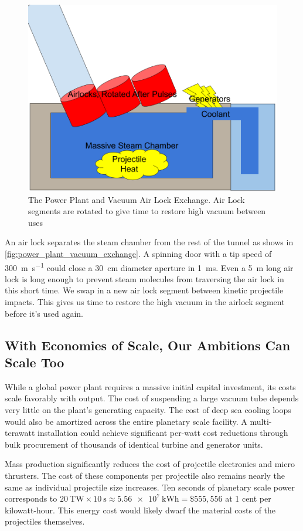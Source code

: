 \documentclass{article}
\begin{document}
\begin{figure}[htpb]
    \centering
    \includegraphics[width=0.5\linewidth]{images/Power Plant Cooling and Generators.png}
    \caption{The Power Plant and Vacuum Air Lock Exchange.  Air Lock segments are rotated to give time to restore high vacuum between uses}
    \label{fig:power_plant_vacuum_exchange}
\end{figure}

An air lock separates the steam chamber from the rest of the tunnel as shows in \autoref{fig:power_plant_vacuum_exchange}.   A spinning door with a tip speed of \SI{300}{\meter\per\second} could close a \SI{30}{\centi\meter} diameter aperture in \SI{1}{\milli\second}.  Even a \SI{5}{\meter} long air lock is long enough to prevent steam molecules from traversing the air lock in this short time.   We swap in a new air lock segment between kinetic projectile impacts.  This gives us time to restore the high vacuum in the airlock segment before it's used again.   


\subsection{With Economies of Scale, Our Ambitions Can Scale Too}\label{sec:strawway_economics}

While a global power plant requires a massive initial capital investment, its costs scale favorably with output. The cost of suspending a large vacuum tube depends very little on the plant's generating capacity. The cost of deep sea cooling loops would also be amortized across the entire planetary scale facility.  A multi-terawatt installation could achieve significant per-watt cost reductions through bulk procurement of thousands of identical turbine and generator units. 

Mass production significantly reduces the cost of projectile electronics and micro thrusters. The cost of these components per projectile also remains nearly the same as individual projectile size increases.  Ten seconds of planetary scale power corresponds to $\SI{20}{\tera\watt} \times \SI{10}{\second} \approx \SI{5.56e7}{\kilo\watt\hour} = \$555,556$ at 1 cent per kilowatt-hour.  This energy cost would likely dwarf the material costs of the projectiles themselves.      
\end{document}
